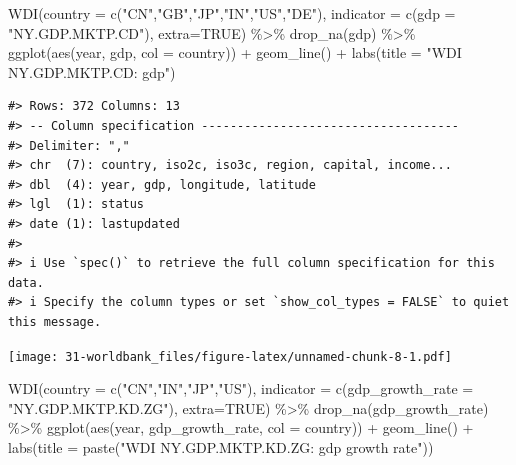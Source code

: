 \documentclass[
]{bxjsbook}
\newenvironment{Shaded}{\begin{snugshade}}{\end{snugshade}}
\newcommand{\AttributeTok}[1]{\textcolor[rgb]{0.77,0.63,0.00}{#1}}
\newcommand{\ConstantTok}[1]{\textcolor[rgb]{0.00,0.00,0.00}{#1}}
\newcommand{\FunctionTok}[1]{\textcolor[rgb]{0.00,0.00,0.00}{#1}}
\newcommand{\NormalTok}[1]{#1}
\newcommand{\SpecialCharTok}[1]{\textcolor[rgb]{0.00,0.00,0.00}{#1}}
\newcommand{\StringTok}[1]{\textcolor[rgb]{0.31,0.60,0.02}{#1}}
\theoremstyle{definition}
\theoremstyle{definition}
\theoremstyle{definition}
\theoremstyle{definition}
\theoremstyle{remark}
\begin{document}
\begin{Shaded}
\begin{Highlighting}[]
\FunctionTok{WDI}\NormalTok{(}\AttributeTok{country =} \FunctionTok{c}\NormalTok{(}\StringTok{"CN"}\NormalTok{,}\StringTok{"GB"}\NormalTok{,}\StringTok{"JP"}\NormalTok{,}\StringTok{"IN"}\NormalTok{,}\StringTok{"US"}\NormalTok{,}\StringTok{"DE"}\NormalTok{), }\AttributeTok{indicator =} \FunctionTok{c}\NormalTok{(}\AttributeTok{gdp =} \StringTok{"NY.GDP.MKTP.CD"}\NormalTok{), }\AttributeTok{extra=}\ConstantTok{TRUE}\NormalTok{) }\SpecialCharTok{\%\textgreater{}\%} \FunctionTok{drop\_na}\NormalTok{(gdp) }\SpecialCharTok{\%\textgreater{}\%} 
  \FunctionTok{ggplot}\NormalTok{(}\FunctionTok{aes}\NormalTok{(year, gdp, }\AttributeTok{col =}\NormalTok{ country)) }\SpecialCharTok{+} \FunctionTok{geom\_line}\NormalTok{() }\SpecialCharTok{+}
  \FunctionTok{labs}\NormalTok{(}\AttributeTok{title =} \StringTok{"WDI NY.GDP.MKTP.CD: gdp"}\NormalTok{)}
\end{Highlighting}
\end{Shaded}

\begin{verbatim}
#> Rows: 372 Columns: 13
#> -- Column specification ------------------------------------
#> Delimiter: ","
#> chr  (7): country, iso2c, iso3c, region, capital, income...
#> dbl  (4): year, gdp, longitude, latitude
#> lgl  (1): status
#> date (1): lastupdated
#> 
#> i Use `spec()` to retrieve the full column specification for this data.
#> i Specify the column types or set `show_col_types = FALSE` to quiet this message.
\end{verbatim}

\texttt{[image: 31-worldbank\_files/figure-latex/unnamed-chunk-8-1.pdf]}

\begin{Shaded}
\begin{Highlighting}[]
\FunctionTok{WDI}\NormalTok{(}\AttributeTok{country =} \FunctionTok{c}\NormalTok{(}\StringTok{"CN"}\NormalTok{,}\StringTok{"IN"}\NormalTok{,}\StringTok{"JP"}\NormalTok{,}\StringTok{"US"}\NormalTok{), }
    \AttributeTok{indicator =} \FunctionTok{c}\NormalTok{(}\AttributeTok{gdp\_growth\_rate =} \StringTok{"NY.GDP.MKTP.KD.ZG"}\NormalTok{), }\AttributeTok{extra=}\ConstantTok{TRUE}\NormalTok{) }\SpecialCharTok{\%\textgreater{}\%}
  \FunctionTok{drop\_na}\NormalTok{(gdp\_growth\_rate) }\SpecialCharTok{\%\textgreater{}\%} 
  \FunctionTok{ggplot}\NormalTok{(}\FunctionTok{aes}\NormalTok{(year, gdp\_growth\_rate, }\AttributeTok{col =}\NormalTok{ country)) }\SpecialCharTok{+} \FunctionTok{geom\_line}\NormalTok{() }\SpecialCharTok{+}
  \FunctionTok{labs}\NormalTok{(}\AttributeTok{title =} \FunctionTok{paste}\NormalTok{(}\StringTok{"WDI NY.GDP.MKTP.KD.ZG: gdp growth rate"}\NormalTok{))}
\end{Highlighting}
\end{Shaded}
\end{document}
